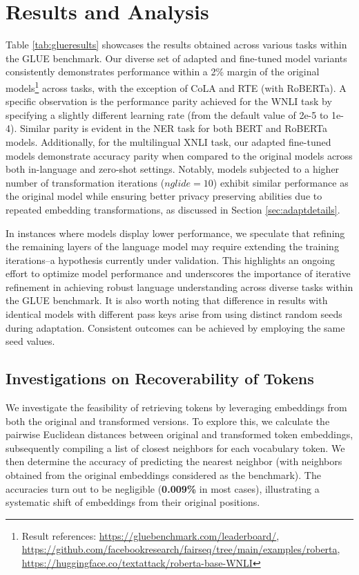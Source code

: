 \documentclass[letterpaper]{article} %
\begin{document}
\section{Results and Analysis}
\label{sec:results}
Table \ref{tab:glueresults} showcases the results obtained across various tasks within the GLUE benchmark. Our diverse set of adapted and fine-tuned model variants consistently demonstrates performance within a 2\% margin of the original models\footnote{Result references: \url{https://gluebenchmark.com/leaderboard/}, \url{https://github.com/facebookresearch/fairseq/tree/main/examples/roberta}, \url{https://huggingface.co/textattack/roberta-base-WNLI}} across tasks, with the exception of CoLA and RTE (with RoBERTa). A specific observation is the performance parity achieved for the WNLI task by specifying a slightly different learning rate (from the default value of 2e-5 to 1e-4). Similar parity is evident in the NER task for both BERT and RoBERTa models. Additionally, for the multilingual XNLI task, our adapted fine-tuned models demonstrate accuracy parity when compared to the original models across both in-language and zero-shot settings. Notably, models subjected to a higher number of transformation iterations ($nglide=10$) exhibit similar performance as the original model while ensuring better privacy preserving abilities due to repeated embedding transformations, as discussed in Section \ref{sec:adaptdetails}.

In instances where models display lower performance, we speculate that refining the remaining layers of the language model may require extending the training iterations--a hypothesis currently under validation. This highlights an ongoing effort to optimize model performance and underscores the importance of iterative refinement in achieving robust language understanding across diverse tasks within the GLUE benchmark. It is also worth noting that difference in results with identical models with different pass keys arise from using distinct random seeds during adaptation. Consistent outcomes can be achieved by employing the same seed values.

\subsection{Investigations on Recoverability of Tokens}
We investigate the feasibility of retrieving tokens by leveraging embeddings from both the original and transformed versions. To explore this, we calculate the pairwise Euclidean distances between original and transformed token embeddings, subsequently compiling a list of closest neighbors for each vocabulary token. We then determine the accuracy of predicting the nearest neighbor (with neighbors obtained from the original embeddings considered as the benchmark). The accuracies turn out to be negligible (\textbf{0.009\%} in most cases), illustrating a systematic shift of embeddings from their original positions.
\end{document}
